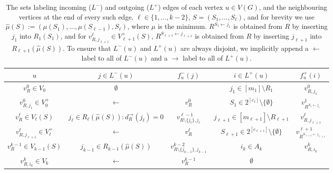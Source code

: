 \documentclass{article}
\renewcommand{\>}{\rangle}
\newcommand{\<}{\langle}
\renewcommand{\(}{\left(}
\renewcommand{\)}{\right)}
\begin{document}
\begin{table}
\renewcommand{\arraystretch}{1.3}
\begin{tabular}{|c|c|c|c|c|}
\hline
$u$ & $j\in L^-(u)$ & $f^-_u(j)$ & $i\in L^+(u)$ & $f^+_u(i)$\\
\hline
\hline
$v_R^0\in V_0$ & $\emptyset$ & & $j_1\in [m_1]\setminus R_1$ & $v_{R,j_1}^0$\\ 
\hline
$v_{R,j_1}^0\in V_0^+$ & $\leftarrow$ & $v_R^0$ & $S_1\in 2^{[c_1]}\setminus\{\emptyset\}$ & $v_{R^{S_1 \leftarrow j_1}}^1$\\
\hline
$v_{R}^{\ell}\in V_{\ell}(S)$ & $j_{\ell}\in R_{\ell}(\hat\mu(S)):d_R^{\rightarrow}(j_{\ell})=0$ & $v_{R\setminus\{j_{\ell}\},j_{\ell}}^{\ell-1}$ & $j_{\ell+1}\in [m_{\ell+1}]\setminus R_{\ell+1}$ & $v_{R,j_{\ell+1}}^{\ell}$\\ 
\hline
$v_{R,j_{\ell+1}}^{\ell}\in V_{\ell}^+$ & $\leftarrow$ & $v_{R}^{\ell}$ & $S_{\ell+1}\in 2^{[c_{\ell+1}]}\setminus\{\emptyset\}$ & $v_{R^{S_{\ell+1}\leftarrow j_{\ell+1}}}^{\ell+1}$\\
\hline
$v_{R}^{k-1}\in V_{k-1}(S)$ & $j_{k-1}\in R_{k-1}(\hat\mu(S))$ & $v_{R\setminus\{j_{k-1}\},j_{k-1}}^{k-2}$ & $i_k\in A_k$ & $v_{R,i_k}^k$\\
\hline
$v_{R,i_k}^k\in V_k$ & $\leftarrow$ & $v_R^{k-1}$ & $\emptyset$ & \\
\hline
\end{tabular}
\caption{The sets labeling incoming ($L^-$) and outgoing ($L^+$) edges of each vertex $u\in V(G)$, and the neighbouring vertices at the end of every such edge. $\ell\in\{1,\dots,k-2\}$, $S=(S_1,\dots,S_{\ell})$, and for brevity we use $\hat\mu(S):=(\mu(S_1),\dots,\mu(S_{\ell-1}),S_{\ell})$, where $\mu$ is the minimum. 
$R^{S_1\leftarrow j_1}$ is obtained from $R$ by inserting $j_1$ into $R_1(S_1)$, and for $v^{\ell}_{R,j_{\ell+1}}\in V_{\ell+1}^+(S)$, $R^{S_{\ell+1}\leftarrow j_{\ell+1}}$ is obtained from $R$ by inserting $j_{\ell+1}$ into $R_{\ell+1}(\hat\mu(S))$. To ensure that $L^-(u)$ and $L^+(u)$ are always disjoint, we implicitly append a $\leftarrow$ label to all of $L^-(u)$ and a $\rightarrow$ label to all of $L^+(u)$. }\label{tab:k-dist-index-sets}
\end{table}
\end{document}
